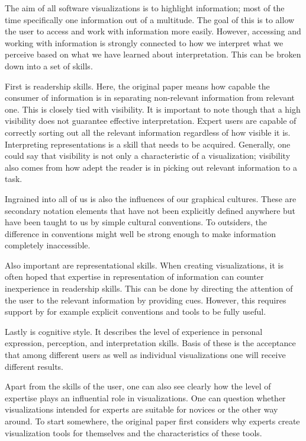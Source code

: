 \documentclass[11pt, a4paper, ngerman, twoside]{article}
\theoremstyle{plain}\newtheorem{Lemma}{Lemma}
\theoremstyle{plain}\newtheorem{Satz}[Lemma]{Satz}
\theoremstyle{definition}\newtheorem{Definition}[Lemma]{Definition}
\theoremstyle{definition}\newtheorem*{Beispiel}{Beispiel}
\theoremstyle{remark}\newtheorem*{Bemerkung}{Bemerkung}
\begin{document}
The aim of all software visualizations is to highlight information; most of the time specifically one information out of a multitude. The goal of this is to allow the user to access and work with information more easily. However, accessing and working with information is strongly connected to how we interpret what we perceive based on what we have learned about interpretation. This can be broken down into a set of skills.

First is readership skills. Here, the original paper means how capable the consumer of information is in separating non-relevant information from relevant one. This is closely tied with visibility. It is important to note though that a high visibility does not guarantee effective interpretation. Expert users are capable of correctly sorting out all the relevant information regardless of how visible it is. Interpreting representations is a skill that needs to be acquired\cite{green}. Generally, one could say that visibility is not only a characteristic of a visualization; visibility also comes from how adept the reader is in picking out relevant information to a task.

Ingrained into all of us is also the influences of our graphical cultures. These are secondary notation elements that have not been explicitly defined anywhere but have been taught to us by simple cultural conventions. To outsiders, the difference in conventions might well be strong enough to make information completely inaccessible.

Also important are representational skills. When creating visualizations, it is often hoped that expertise in representation of information can counter inexperience in readership skills. This can be done by directing the attention of the user to the relevant information by providing cues. However, this requires support by for example explicit conventions and tools to be fully useful.

Lastly is cognitive style. It describes the level of experience in personal expression, perception, and interpretation skills. Basis of these is the acceptance that among different users as well as individual visualizations one will receive different results.

Apart from the skills of the user, one can also see clearly how the level of expertise plays an influential role in visualizations. One can question whether visualizations intended for experts are suitable for novices or the other way around. To start somewhere, the original paper first considers why experts create visualization tools for themselves and the characteristics of these tools.
\end{document}

